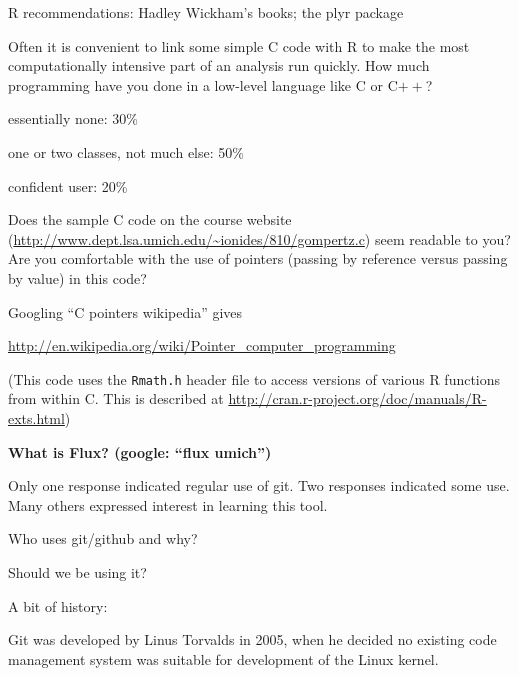 \documentclass[portrait,11pt]{seminar}
\begin{document}
R recommendations: Hadley Wickham's books; the plyr package

\es
\bs

\bf



\es \bs 

{\bf

Often it is convenient to link some simple C code with R to make the most computationally intensive part of an analysis run quickly. How much programming have you done in a low-level language like C or C$++$? 
}


essentially none: 30\%

one or two classes, not much else: 50\%

confident user: 20\%

\es \bs \bf

 Does the sample C code on the course website (\url{http://www.dept.lsa.umich.edu/~ionides/810/gompertz.c}) seem readable to you? Are you comfortable with the use of pointers (passing by reference versus passing by value) in this code?

\normalfont
Googling ``C  pointers wikipedia'' gives

\url{http://en.wikipedia.org/wiki/Pointer_computer_programming}

\es \bs \bf

(This code uses the \texttt{Rmath.h} header file to access versions of various R functions from within C. This is described at \url{http://cran.r-project.org/doc/manuals/R-exts.html})

\normalfont
\es

\bs
\bf
What is Flux? (google: ``flux umich'')

\medskip


\es

\bs
\bf

Only one response indicated regular use of git. Two responses indicated some use. Many others expressed interest in learning this tool. 

\medskip

Who uses git/github and why?

\medskip

Should we be using it?

\es

\bs
A bit of history:

Git was developed by Linus Torvalds in 2005, when he decided no existing code management system was suitable for development of the Linux kernel.
\end{document}
